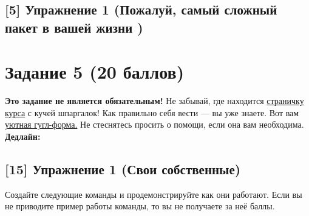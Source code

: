 \documentclass[12pt, a4paper, oneside]{article}
\begin{document}
	
	
	\subsection*{[5]   Упражнение 1 (Пожалуй, самый сложный пакет в вашей жизни ) }
	

	
	
	
	
	
	\section*{Задание 5  (20 баллов)  }
	
	\textbf{Это задание не является обязательным!}   Не забывай, где находится  \href{https://fulyankin.github.io/LaTeX/}{страничку курса} с кучей шпаргалок! Как правильно себя вести — вы уже знаете. Вот вам \href{https://docs.google.com/forms/d/e/1FAIpQLSe11kxKVfv07iCL1E9yNX7ll9swKImiVwRr1H70lslGzInRSg/viewform}{уютная гугл-форма.}   Не стеснятесь просить о помощи, если она вам необходима. \textbf{Дедлайн:  } 
	

\subsection*{[15]  Упражнение 1  (Свои собственные)}

Создайте следующие команды и продемонстрируйте как они работают. Если вы не приводите пример работы команды, то вы не получаете за неё баллы.
\end{document}
